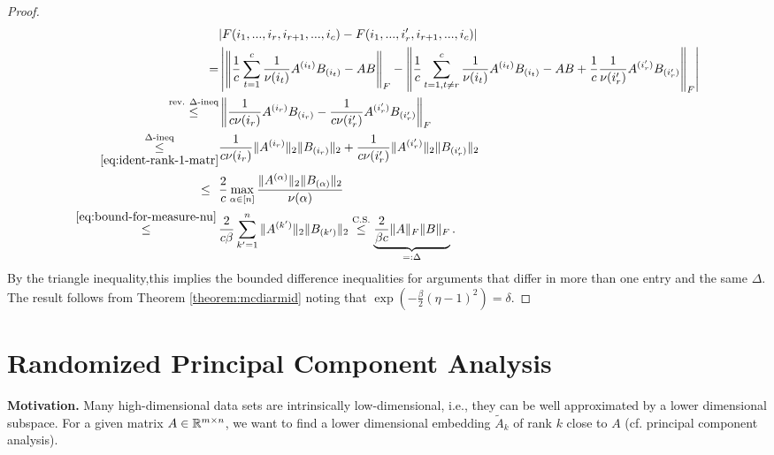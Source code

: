 \begin{theorem}
\begin{proof}
\begin{equation*}
\begin{split}
& |F(i_1,...,i_r,i_{r+1},...,i_c)-F(i_1,...,i_r',i_{r+1},...,i_c)|\\
= &\left|
\left\|
\frac{1}{c}
\sum_{t=1}^c \frac{1}{\nu(i_t)} A^{(i_t)} B_{(i_t)} - AB
\right\|_F - 
\left\|
\frac{1}{c}
\sum_{t=1, t\neq r}^c \frac{1}{\nu(i_t)} A^{(i_t)} B_{(i_t)} - AB +
\frac{1}{c} \frac{1}{\nu(i'_r)}A^{(i_r')}B_{(i'_r)}
\right\|_F
\right| \\
\overset{\text{rev. }\Delta\text{-ineq}}{\leq}
&
\left\|
\frac{1}{c\nu(i_r)} A^{(i_r)} B_{(i_r)} - \frac{1}{c\nu(i'_r)} A^{(i'_r)} B_{(i'_r)}
\right\|_F \\
\underset{\eqref{eq:ident-rank-1-matr}}{\overset{\Delta\text{-ineq}}{\leq}} &
\frac{1}{c\nu(i_r)} \|A^{(i_r)}\|_2 \|B_{(i_r)}\|_2 +  \frac{1}{c\nu(i'_r)} \|A^{(i'_r)}\|_2 \|B_{(i'_r)}\|_2 \\
\leq \ \ & \frac{2}{c} \max_{\alpha \in [n]}\frac{\|A^{(\alpha)}\|_2\|B_{(\alpha)}\|_2}{\nu(\alpha)} \\
\overset{\eqref{eq:bound-for-measure-nu}}{\leq} \, &
\frac{2}{c\beta} \sum_{k'=1}^n \|A^{(k')}\|_2 \|B_{(k')}\|_2 \overset{\text{C.S.}}\leq \underbrace{\frac{2}{\beta c}\|A\|_F \|B\|_F}_{=: \Delta}.
\end{split}
\end{equation*}
By the triangle inequality,this implies the bounded difference inequalities for arguments that differ in more than one entry and the same $\Delta$. The result follows from Theorem \ref{theorem:mcdiarmid} noting that $\exp(-\frac{\beta}{2}(\eta-1)^2)=\delta$.
\end{proof}
\end{theorem}
\section{Randomized Principal Component Analysis}
\textbf{Motivation.} Many high-dimensional data sets are intrinsically low-dimensional, i.e., they can be well approximated by a lower dimensional subspace. For a given matrix $A\in\mathbb{R}^{m \times n}$, we want to find a lower dimensional embedding $\tilde{A}_k$ of rank $k$ close to $A$ (cf. principal component analysis). 

